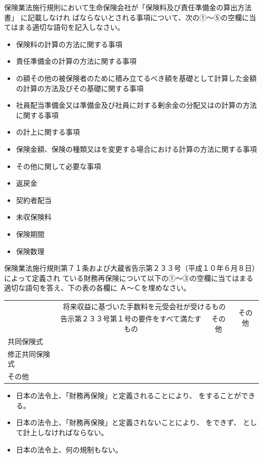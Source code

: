 \documentclass[report,gutter=10mm,fore-edge=10mm,uplatex,dvipdfmx]{jlreq}
\begin{document}
保険業法施行規則において生命保険会社が「保険料及び責任準備金の算出方法書」 に記載しなけれ
ばならないとされる事項について、次の①～⑤の空欄に当てはまる適切な語句を記入しなさい。

\begin{itemize}
\item[ ] 保険料の計算の方法に関する事項
\item[ ] 責任準備金の計算の方法に関する事項
\item[ ] の額その他の被保険者のために積み立てるべき額を基礎として計算した金額の計算の方法及びその基礎に関する事項
\item[ ] 社員配当準備金又は準備金及び社員に対する剰余金の分配又はの計算の方法に関する事項
\item[ ] の計上に関する事項
\item[ ] 保険金額、保険の種類又はを変更する場合における計算の方法に関する事項
\item[ ] その他に関して必要な事項
\end{itemize}

\answer{}
\begin{itemize}
\item[①:]  返戻金
\item[②:]  契約者配当
\item[③:]  未収保険料
\item[④:]  保険期間
\item[⑤:]  保険数理
\end{itemize}

保険業法施行規則第７１条および大蔵省告示第２３３号（平成１０年６月８日）によって定義され
ている財務再保険について以下の①～③の空欄に当てはまる適切な語句を答え、下の表の各欄に
Ａ～Ｃを埋めなさい。

\begin{tabular}{|l|c|c|c|}
 \hline
\multirow{2}{*}{}& \multicolumn{2}{c|}{将来収益に基づいた手数料を元受会社が受けるもの}
 &\multirow{2}{*}{その他}\\  \cline{2-3}
&告示第２３３号第１号の要件をすべて満たすもの&その他&\\ \hline
共同保険式  & & & \\ \hline
修正共同保険式 & & & \\ \hline
その他 & & & \\ \hline
\end{tabular}

\begin{itemize}
\item[ Ａ：] 日本の法令上、「財務再保険」と定義されることにより、 をすることができる。
\item[ Ｂ：] 日本の法令上、「財務再保険」と定義されないことにより、 をできず、 として計上しなければならない。
\item[ Ｃ：] 日本の法令上、何の規制もない。
\end{itemize}
\answer{}
\end{document}
